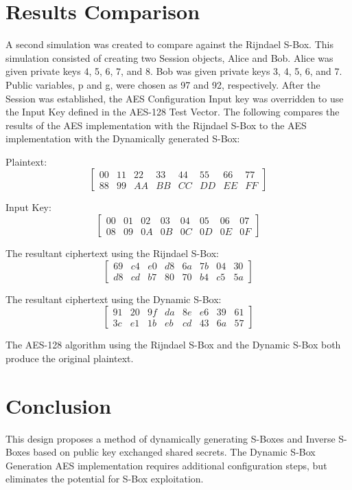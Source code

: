 \documentclass[journal]{IEEEtran}
\begin{document}
\section{Results Comparison}
A second simulation was created to compare against the Rijndael S-Box. This simulation consisted of creating two Session objects, Alice and Bob. Alice was given private keys 4, 5, 6, 7, and 8. 
Bob was given private keys 3, 4, 5, 6, and 7. Public variables, p and g, were chosen as 97 and 92, respectively. After the Session was established, the AES Configuration Input key was overridden to use the Input Key defined in the AES-128 Test Vector. The following compares the results of the AES implementation with the Rijndael S-Box to the AES implementation with the Dynamically generated S-Box:

Plaintext:
$$
\begin{bmatrix}
00 & 11 & 22 & 33 & 44 & 55 & 66 & 77 \\
88 & 99 & AA & BB & CC & DD & EE & FF
\end{bmatrix}
$$

Input Key:
$$
\begin{bmatrix}
00 & 01 & 02 & 03 & 04 & 05 & 06 & 07 \\
08 & 09 & 0A & 0B & 0C & 0D & 0E & 0F
\end{bmatrix}
$$

The resultant ciphertext using the Rijndael S-Box:
$$
\begin{bmatrix}
69 & c4 & e0 & d8 & 6a & 7b & 04 & 30 \\
d8 & cd & b7 & 80 & 70 & b4 & c5 & 5a
\end{bmatrix}
$$

The resultant ciphertext using the Dynamic S-Box:
$$
\begin{bmatrix}
91 & 20 & 9f & da & 8e & e6 & 39 & 61 \\
3c & e1 & 1b & eb & cd & 43 & 6a & 57
\end{bmatrix}
$$

The AES-128 algorithm using the Rijndael S-Box and the Dynamic S-Box both produce the original plaintext.

\section{Conclusion}
This design proposes a method of dynamically generating S-Boxes and Inverse S-Boxes based on public key exchanged shared secrets. The Dynamic S-Box Generation AES implementation requires additional configuration steps, but eliminates the potential for S-Box exploitation.
\end{document}
